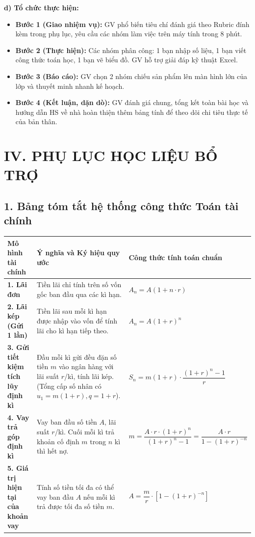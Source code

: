 \documentclass[12pt, a4paper]{article}
\begin{document}
\noindent \textbf{d) Tổ chức thực hiện:}
\begin{itemize}
    \item \textbf{Bước 1 (Giao nhiệm vụ):} GV phổ biến tiêu chí đánh giá theo Rubric đính kèm trong phụ lục, yêu cầu các nhóm làm việc trên máy tính trong 8 phút.
    \item \textbf{Bước 2 (Thực hiện):} Các nhóm phân công: 1 bạn nhập số liệu, 1 bạn viết công thức toán học, 1 bạn vẽ biểu đồ. GV hỗ trợ giải đáp kỹ thuật Excel.
    \item \textbf{Bước 3 (Báo cáo):} GV chọn 2 nhóm chiếu sản phẩm lên màn hình lớn của lớp và thuyết minh nhanh kế hoạch.
    \item \textbf{Bước 4 (Kết luận, dặn dò):} GV đánh giá chung, tổng kết toàn bài học và hướng dẫn HS về nhà hoàn thiện thêm bảng tính để theo dõi chi tiêu thực tế của bản thân.
\end{itemize}

\vspace{5pt}

\section*{IV. PHỤ LỤC HỌC LIỆU BỔ TRỢ}

\subsection*{1. Bảng tóm tắt hệ thống công thức Toán tài chính}

\begin{center}
\renewcommand{\arraystretch}{1.3}
\begin{tabularx}{\textwidth}{|p{3.5cm}|X|p{4.5cm}|}
    \hline
    \textbf{Mô hình tài chính} & \textbf{Ý nghĩa và Ký hiệu quy ước} & \textbf{Công thức tính toán chuẩn} \\
    \hline
    \textbf{1. Lãi đơn} & Tiền lãi chỉ tính trên số vốn gốc ban đầu qua các kì hạn. & $A_n = A(1 + n \cdot r)$ \\
    \hline
    \textbf{2. Lãi kép (Gửi 1 lần)} & Tiền lãi sau mỗi kì hạn được nhập vào vốn để tính lãi cho kì hạn tiếp theo. & $A_n = A(1 + r)^n$ \\
    \hline
    \textbf{3. Gửi tiết kiệm tích lũy định kì} & Đầu mỗi kì gửi đều đặn số tiền $m$ vào ngân hàng với lãi suất $r$/kì, tính lãi kép. (Tổng cấp số nhân có $u_1 = m(1+r), q = 1+r$). & $S_n = m(1+r) \cdot \dfrac{(1+r)^n - 1}{r}$ \\
    \hline
    \textbf{4. Vay trả góp định kì} & Vay ban đầu số tiền $A$, lãi suất $r$/kì. Cuối mỗi kì trả khoản cố định $m$ trong $n$ kì thì hết nợ. & $m = \dfrac{A \cdot r \cdot (1+r)^n}{(1+r)^n - 1} = \dfrac{A \cdot r}{1 - (1+r)^{-n}}$ \\
    \hline
    \textbf{5. Giá trị hiện tại của khoản vay} & Tính số tiền tối đa có thể vay ban đầu $A$ nếu mỗi kì trả được tối đa số tiền $m$. & $A = \dfrac{m}{r} \cdot \left[1 - (1+r)^{-n}\right]$ \\
    \hline
\end{tabularx}
\end{center}
\end{document}
